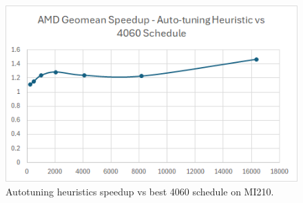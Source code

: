 \begin{figure}[htb]
  \centering
  \includegraphics[width=0.75\linewidth]{figures/AMD_MI210_ATHeuristicVs4060Sched_speedup.png}
  \caption{Autotuning heuristics speedup vs best 4060 schedule on MI210.}
  \label{Fig:AMD_MI210_ATHeuristicVs4060Sched_speedup}
\end{figure}


